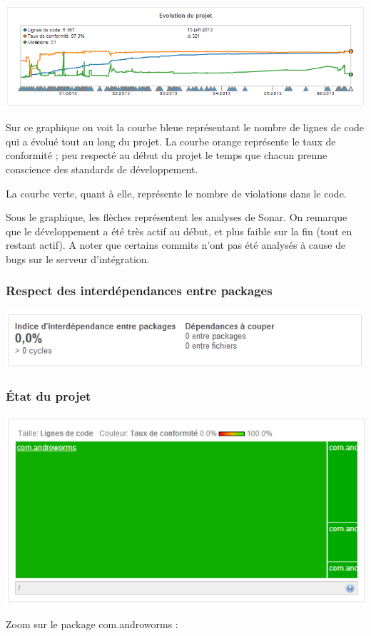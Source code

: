 \documentclass{report}
\begin{document}
\includegraphics[scale=0.55]{images/evolution}

Sur ce graphique on voit la courbe bleue représentant le nombre de
lignes de code qui a évolué tout au long du projet. La courbe orange
représente le taux de conformité ; peu respecté au début du projet le
temps que chacun prenne conscience des standards de développement. 

La courbe verte, quant à elle, représente le nombre de violations dans
le code.

Sous le graphique, les flèches représentent les analyses de Sonar. On
remarque que le développement a été très actif au début, et plus faible
sur la fin (tout en restant actif). A noter que certains commits n’ont
pas été analysés à cause de bugs sur le serveur d’intégration.

\subsubsection{Respect des interdépendances entre packages}
\begin{center}
\includegraphics[scale=0.5]{images/depedencies}
\end{center}

\subsubsection{État du projet}
\begin{center}
\includegraphics[scale=0.8]{images/state1}
\end{center}
Zoom sur le package com.androworms :
\end{document}
